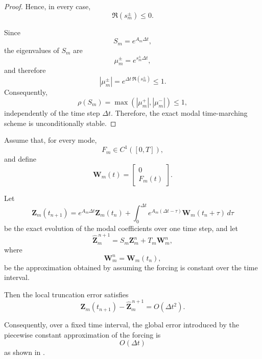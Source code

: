 \documentclass{Configuration_Files/PoliMi3i_thesis}
\begin{document}
\begin{proof}
Hence, in every case,
\begin{equation*}
\Re(s_m^\pm)\le0.
\end{equation*}

Since
\begin{equation*}
S_m=e^{A_m\Delta t},
\end{equation*}
the eigenvalues of $S_m$ are
\begin{equation*}
\mu_m^\pm
=
e^{s_m^\pm\Delta t},
\end{equation*}
and therefore
\begin{equation*}
|\mu_m^\pm|
=
e^{\Delta t\,\Re(s_m^\pm)}
\le1.
\end{equation*}
Consequently,
\begin{equation*}
\rho(S_m)
=
\max\!\left(
|\mu_m^+|,
|\mu_m^-|
\right)
\le1,
\end{equation*}
independently of the time step $\Delta t$. Therefore, the exact modal
time-marching scheme is unconditionally stable.
\end{proof}

\begin{proposition}
Assume that, for every mode,
\begin{equation*}
F_m\in C^1([0,T]),
\end{equation*}
and define
\begin{equation*}
\mathbf W_m(t)
=
\begin{bmatrix}
0\\
F_m(t)
\end{bmatrix}.
\end{equation*}

Let
\begin{equation*}
\mathbf Z_m(t_{n+1})
=
e^{A_m\Delta t}\mathbf Z_m(t_n)
+
\int_0^{\Delta t}
e^{A_m(\Delta t-\tau)}
\mathbf W_m(t_n+\tau)\,d\tau
\end{equation*}
be the exact evolution of the modal coefficients over one time step, and let
\begin{equation*}
\hat{\mathbf Z}_m^{\,n+1}
=
S_m\mathbf Z_m^n
+
T_m\mathbf W_m^n,
\end{equation*}
where
\begin{equation*}
\mathbf W_m^n
=
\mathbf W_m(t_n),
\end{equation*}
be the approximation obtained by assuming the forcing is constant over the time interval.

Then the local truncation error satisfies
\begin{equation*}
\mathbf Z_m(t_{n+1})
-
\hat{\mathbf Z}_m^{\,n+1}
=
O(\Delta t^2).
\end{equation*}

Consequently, over a fixed time interval, the global error introduced by the
piecewise constant approximation of the forcing is
\begin{equation*}
O(\Delta t)
\end{equation*}
as shown in \cite{quarteroni_numerical_2014}.
\end{proposition}
\end{document}
